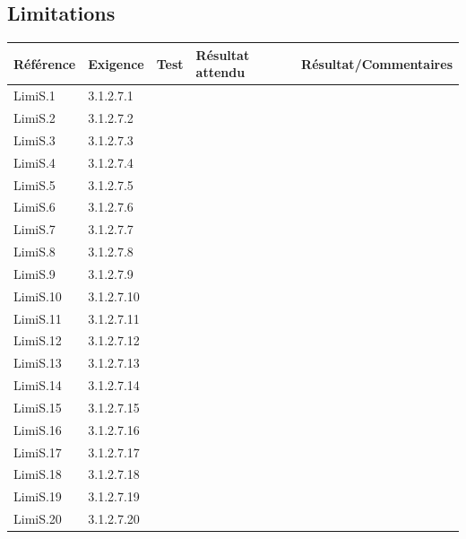 \documentclass[10pt,a4paper,landscape]{report}
\begin{document}
\subsection{Limitations}
\begin{center}
	\bgroup
	\def\arraystretch{1.5}
	\begin{tabular}{|p{1.5cm}|p{2cm}|p{8.5cm}|p{8.5cm}|p{5cm}|}
		\hline
		\rowcolor{gris}Référence & Exigence & Test & Résultat attendu & Résultat/Commentaires\\
		\hline
		LimiS.1 & 3.1.2.7.1 & & & \\
		\hline
		LimiS.2 & 3.1.2.7.2 & & & \\
		\hline
		LimiS.3 & 3.1.2.7.3 & & & \\
		\hline
		LimiS.4 & 3.1.2.7.4 & & & \\
		\hline
		LimiS.5 & 3.1.2.7.5 & & & \\
		\hline
		LimiS.6 & 3.1.2.7.6 & & & \\
		\hline
		LimiS.7 & 3.1.2.7.7 & & & \\
		\hline
		LimiS.8 & 3.1.2.7.8 & & & \\
		\hline
		LimiS.9 & 3.1.2.7.9 & & & \\
		\hline
		LimiS.10 & 3.1.2.7.10 & & & \\
		\hline
		LimiS.11 & 3.1.2.7.11 & & & \\
		\hline
		LimiS.12 & 3.1.2.7.12 & & & \\
		\hline
		LimiS.13 & 3.1.2.7.13 & & & \\
		\hline
		LimiS.14 & 3.1.2.7.14 & & & \\
		\hline
		LimiS.15 & 3.1.2.7.15 & & & \\
		\hline
		LimiS.16 & 3.1.2.7.16 & & & \\
		\hline
		LimiS.17 & 3.1.2.7.17 & & & \\
		\hline
		LimiS.18 & 3.1.2.7.18 & & & \\
		\hline
		LimiS.19 & 3.1.2.7.19 & & & \\
		\hline
		LimiS.20 & 3.1.2.7.20 & & & \\
		\hline
	\end{tabular}
	\egroup
\end{center}
\end{document}
